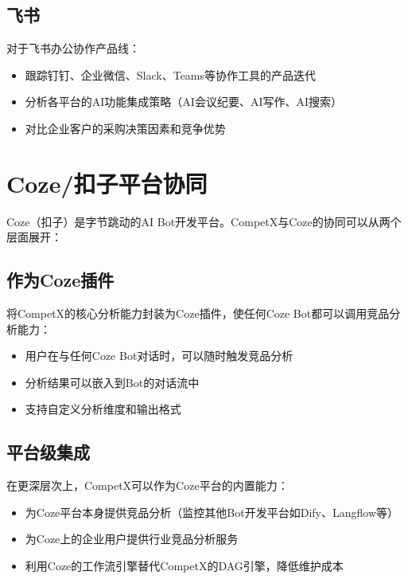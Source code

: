 \documentclass[12pt,a4paper]{ctexrep}
\begin{document}
\subsection{飞书}

对于飞书办公协作产品线：

\begin{itemize}[leftmargin=2em]
\item 跟踪钉钉、企业微信、Slack、Teams等协作工具的产品迭代
\item 分析各平台的AI功能集成策略（AI会议纪要、AI写作、AI搜索）
\item 对比企业客户的采购决策因素和竞争优势
\end{itemize}

\section{Coze/扣子平台协同}

Coze（扣子）\cite{coze2025}是字节跳动的AI Bot开发平台。CompetX与Coze的协同可以从两个层面展开：

\subsection{作为Coze插件}

将CompetX的核心分析能力封装为Coze插件，使任何Coze Bot都可以调用竞品分析能力：

\begin{itemize}[leftmargin=2em]
\item 用户在与任何Coze Bot对话时，可以随时触发竞品分析
\item 分析结果可以嵌入到Bot的对话流中
\item 支持自定义分析维度和输出格式
\end{itemize}

\subsection{平台级集成}

在更深层次上，CompetX可以作为Coze平台的内置能力：

\begin{itemize}[leftmargin=2em]
\item 为Coze平台本身提供竞品分析（监控其他Bot开发平台如Dify、Langflow等）
\item 为Coze上的企业用户提供行业竞品分析服务
\item 利用Coze的工作流引擎替代CompetX的DAG引擎，降低维护成本
\end{itemize}
\end{document}
